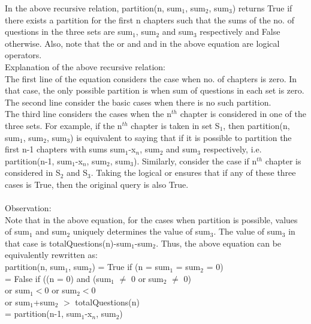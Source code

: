\documentclass{article}
\begin{document}
In the above recursive relation, partition(n, sum$_{1}$, sum$_{2}$, sum$_{3}$) returns True if there exists a partition for the first n chapters such that the sums of the no. of questions in the three sets are sum$_{1}$, sum$_{2}$ and sum$_{3}$ respectively and False otherwise. Also, note that the or and and in the above equation are logical operators.
\\
Explanation of the above recursive relation:
\\The first line of the equation considers the case when no. of chapters is zero. In that case, the only possible partition is when sum of questions in each set is zero.
\\The second line consider the basic cases when there is no such partition. 
\\The third line considers the cases when the n$^{th}$ chapter is considered in one of the three sets. For example, if the n$^{th}$ chapter is taken in set S$_{1}$, then partition(n, sum$_{1}$, sum$_{2}$, sum$_{3}$) is equivalent to saying that if it is possible to partition the first n-1 chapters with sums sum$_{1}$-x$_{n}$, sum$_{2}$ and sum$_{3}$ respectively, i.e. partition(n-1, sum$_{1}$-x$_{n}$, sum$_{2}$, sum$_{3}$). Similarly, consider the case if n$^{th}$ chapter is considered in S$_{2}$ and S$_{3}$. Taking the logical or ensures that if any of these three cases is True, then the original query is also True.
\\
\\Observation:
\\
Note that in the above equation, for the cases when partition is possible, values of sum$_{1}$ and sum$_{2}$ uniquely determines the value of sum$_{3}$. The value of sum$_{3}$ in that case is totalQuestions(n)-sum$_{1}$-sum$_{2}$. Thus, the above equation can be equivalently rewritten as:
\\
partition(n, sum$_{1}$, sum$_{2}$) = True \hspace{1.5cm} if (n = sum$_{1}$ = sum$_{2}$ = 0)
\\\indent  \hspace{3.3cm}     = False \hspace{1.5cm} if ((n = 0) and (sum$_{1}$ $\neq$ 0 or sum$_{2}$ $\neq$ 0)
\\\indent  \hspace{6.2cm} or sum$_{1}<0$ or sum$_{2}<0$ 
\\\indent  \hspace{6.2cm} or sum$_{1}$+sum$_{2}$ $>$ totalQuestions(n)
\\\indent  \hspace{3.3cm}     = partition(n-1, sum$_{1}$-x$_{n}$, sum$_{2}$) 
\end{document}
